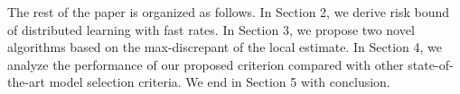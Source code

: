 \documentclass{article}
\newcommand{\argmin}{\operatornamewithlimits{arg\,min}}
\begin{document}
The rest of the paper is organized as follows.
In Section 2, we derive risk bound of distributed learning with fast rates.
In Section 3, we  propose two novel algorithms based on the max-discrepant of the local estimate.
In Section 4, we analyze the performance of our proposed criterion compared with other state-of-the-art model selection criteria.
We end in Section 5 with conclusion.



%
%
%
\end{document}
